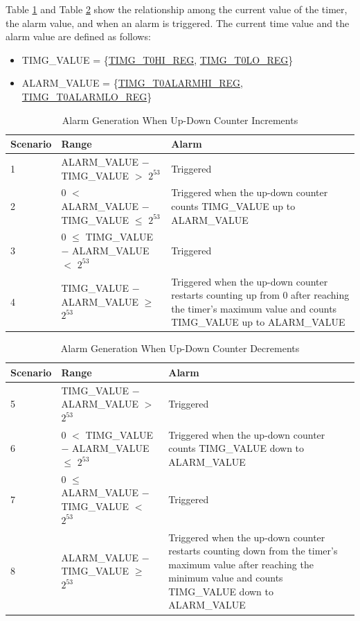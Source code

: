 \documentclass[main\_\_EN.tex]{subfiles}
\begin{document}
Table \ref{tab:timg-alarm-generation-up} and Table \ref{tab:timg-alarm-generation-down} show the relationship among the current value of the timer, the alarm value, and when an alarm is triggered. The current time value and the alarm value are defined as follows:

\begin{itemize}
    \item TIMG\_VALUE = \{\hyperref[regdesc:TIMGTXHIREG]{TIMG\_T0HI\_REG}, \hyperref[regdesc:TIMGTXLOREG]{TIMG\_T0LO\_REG}\}
    \item ALARM\_VALUE = \{\hyperref[regdesc:TIMGTXALARMHIREG]{TIMG\_T0ALARMHI\_REG}, \hyperref[regdesc:TIMGTXALARMLOREG]{TIMG\_T0ALARMLO\_REG}\}
\end{itemize}

\begin{table}[H]
\centering
\caption{Alarm Generation When Up-Down Counter Increments}
\label{tab:timg-alarm-generation-up}

\begin{tabular}{|l|l|m{7cm}|}
\hline
\rowcolor{lightgray}
    \textbf{Scenario} & \textbf{Range} & \textbf{Alarm} \\\hline
     1 & ALARM\_VALUE $-$ TIMG\_VALUE $>$ $2^{53}$ & Triggered \\\hline
     2 & 0 $<$ ALARM\_VALUE $-$ TIMG\_VALUE $\leq$ $2^{53}$ & Triggered when the up-down counter counts TIMG\_VALUE up to ALARM\_VALUE \\\hline
     3 & 0 $\leq$ TIMG\_VALUE $-$ ALARM\_VALUE $<$ $2^{53}$ & Triggered \\\hline
     4 & TIMG\_VALUE $-$ ALARM\_VALUE $\geq$ $2^{53}$ & Triggered when the up-down counter restarts counting up from 0 after reaching the timer's maximum value and counts TIMG\_VALUE up to ALARM\_VALUE \\\hline
\end{tabular}
\end{table}

\begin{table}[H]
\centering
\caption{Alarm Generation When Up-Down Counter Decrements}
\label{tab:timg-alarm-generation-down}

\begin{tabular}{|l|l|m{7cm}|}
\hline
\rowcolor{lightgray}
    \textbf{Scenario} & \textbf{Range} & \textbf{Alarm} \\\hline
     5 & TIMG\_VALUE $-$ ALARM\_VALUE  $>$ $2^{53}$ & Triggered \\\hline
     6 &  0 $<$ TIMG\_VALUE $-$ ALARM\_VALUE $\leq$ $2^{53}$ & Triggered when the up-down counter counts TIMG\_VALUE down to ALARM\_VALUE \\\hline
     7 & 0 $\leq$ ALARM\_VALUE $-$ TIMG\_VALUE $<$ $2^{53}$ & Triggered \\\hline
     8 & ALARM\_VALUE $-$ TIMG\_VALUE $\geq$ $2^{53}$ & Triggered when the up-down counter restarts counting down from the timer's maximum value after reaching the minimum value and counts TIMG\_VALUE down to ALARM\_VALUE \\\hline
\end{tabular}
\end{table}
\end{document}
